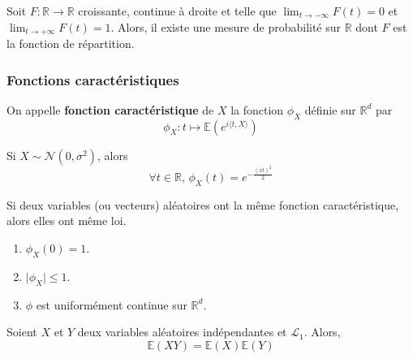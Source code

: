   \begin{theorem}
    Soit $F : \mathbb{R} \rightarrow \mathbb{R}$ croissante, continue à droite et telle que $\lim_{t \rightarrow -\infty} F(t) = 0$ et $\lim_{t \rightarrow +\infty} F(t) = 1$. Alors, il existe une mesure de probabilité sur $\mathbb{R}$ dont $F$ est la fonction de répartition.
  \end{theorem}

  \subsubsection{Fonctions caractéristiques}


  \begin{definition}
    On appelle \textbf{fonction caractéristique} de $X$ la fonction $\phi_X$ définie sur $\mathbb{R}^d$ par
    \[ \phi_X : t \mapsto \mathbb{E}\left( e^{i \langle t, X \rangle} \right) \]
  \end{definition}


  \begin{example}
    Si $X \sim \mathcal{N}(0, \sigma^2)$, alors
    \[ \forall t \in \mathbb{R}, \, \phi_X(t) = e^{-\frac{(xt)^2}{2}} \]
  \end{example}


  \begin{theorem}
    Si deux variables (ou vecteurs) aléatoires ont la même fonction caractéristique, alors elles ont même loi.
  \end{theorem}

  \begin{theorem}
    \begin{enumerate}[label=(\roman*)]
      \item $\phi_X(0) = 1$.
      \item $\vert \phi_X \vert \leq 1$.
      \item $\phi$ est uniformément continue sur $\mathbb{R}^d$.
    \end{enumerate}
  \end{theorem}

  \begin{theorem}
    Soient $X$ et $Y$ deux variables aléatoires indépendantes et $\mathcal{L}_1$. Alors,
    \[ \mathbb{E}(X Y) = \mathbb{E}(X) \mathbb{E}(Y) \]
  \end{theorem}

